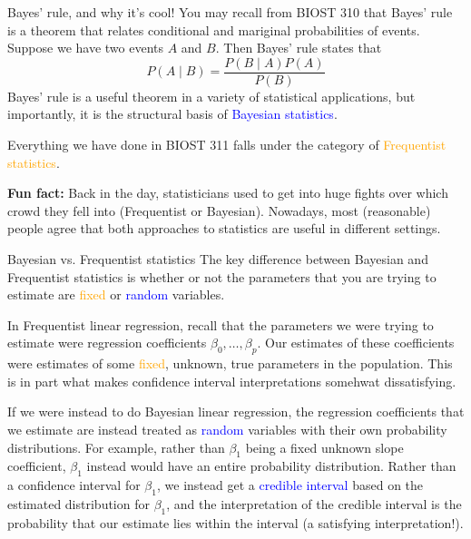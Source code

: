 \documentclass[10pt,t]{beamer}
\begin{document}
\begin{frame}{Bayes' rule, and why it's cool!}
You may recall from BIOST 310 that Bayes' rule is a theorem that relates conditional and mariginal probabilities of events. Suppose we have two events $A$ and $B$. Then Bayes' rule states that
$$
P(A \mid B)  = \frac{P(B \mid A) P(A)}{P(B)}
$$
Bayes' rule is a useful theorem in a variety of statistical applications, but importantly, it is the structural basis of \textcolor{blue}{Bayesian statistics}.

\vspace{0.3cm}

Everything we have done in BIOST 311 falls under the category of \textcolor{orange}{Frequentist statistics}.

\vspace{0.3cm}

\textbf{Fun fact:} Back in the day, statisticians used to get into huge fights over which crowd they fell into (Frequentist or Bayesian). Nowadays, most (reasonable) people agree that both approaches to statistics are useful in different settings.

\end{frame}

\begin{frame}{Bayesian vs. Frequentist statistics}
\small The key difference between Bayesian and Frequentist statistics is whether or not the parameters that you are trying to estimate are \textcolor{orange}{fixed} or \textcolor{blue}{random} variables.

\vspace{0.3cm}

In Frequentist linear regression, recall that the parameters we were trying to estimate were regression coefficients $\beta_0, \dots, \beta_p$. Our estimates of these coefficients were estimates of some \textcolor{orange}{fixed}, unknown, true parameters in the population. This is in part what makes confidence interval interpretations somehwat dissatisfying. 

\vspace{0.3cm}

If we were instead to do Bayesian linear regression, the regression coefficients that we estimate are instead treated as \textcolor{blue}{random} variables with their own probability distributions. For example, rather than $\beta_1$ being a fixed unknown slope coefficient, $\beta_1$ instead would have an entire probability distribution. Rather than a confidence interval for $\beta_1$, we instead get a \textcolor{blue}{credible interval} based on the estimated distribution for $\beta_1$, and the interpretation of the credible interval is the probability that our estimate lies within the interval (a satisfying interpretation!).

\end{frame}
\end{document}
